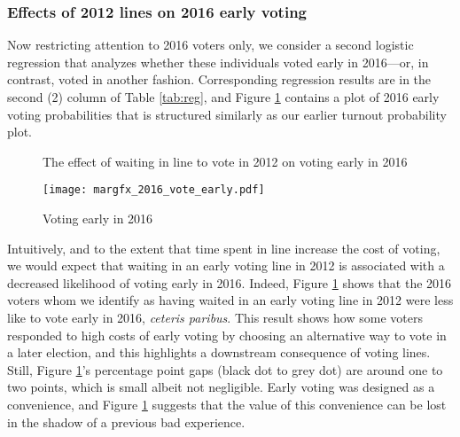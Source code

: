 \documentclass[12pt,titlepage]{article}
\begin{document}



\subsubsection*{Effects of 2012 lines on 2016 early voting}

Now restricting attention to 2016 voters only, we consider a second
logistic regression that analyzes whether these individuals voted
early in 2016---or, in contrast, voted in another fashion.
Corresponding regression results are in the second (2) column of Table
\ref{tab:reg}, and Figure \ref{fig:atevotingearly2016} contains a plot
of 2016 early voting probabilities that is structured similarly as our
earlier turnout probability plot.

\begin{figure}[!ht]
  \caption{The effect of waiting in line to vote in 2012 on voting early in 2016}
  \centering\texttt{[image: margfx\_2016\_vote\_early.pdf]}
  \caption{Voting early in 2016}
  \label{fig:atevotingearly2016}
\end{figure}

Intuitively, and to the extent that time spent in line increase the
cost of voting, we would expect that waiting in an early voting line
in 2012 is associated with a decreased likelihood of voting early in
2016.  Indeed, Figure \ref{fig:atevotingearly2016} shows that the 2016
voters whom we identify as having waited in an early voting line in
2012 were less like to vote early in 2016, \emph{ceteris paribus}.
This result shows how some voters responded to high costs of early
voting by choosing an alternative way to vote in a later election, and
this highlights a downstream consequence of voting lines.  Still,
Figure \ref{fig:atevotingearly2016}'s percentage point gaps (black dot
to grey dot) are around one to two points, which is small albeit not
negligible.  Early voting was designed as a convenience, and Figure
\ref{fig:atevotingearly2016} suggests that the value of this
convenience can be lost in the shadow of a previous bad experience.
\end{document}
